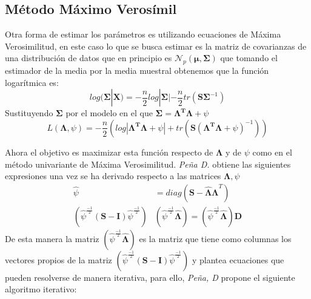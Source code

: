 \subsection{Método Máximo Verosímil}

\noindent Otra forma de estimar los parámetros es utilizando ecuaciones de Máxima Verosimilitud, en este caso lo que se busca estimar es la matriz de covarianzas de una distribución de datos que en principio es $\mathcal{N}_p(\mathbf{\mu},\mathbf{\Sigma})$ que tomando el estimador de la media por la media muestral obtenemos que la función logarítmica es: 
\begin{equation}
log(\mathbf{\Sigma}|\textbf{X})=-\dfrac{n}{2}log|\mathbf{\Sigma}|-\dfrac{n}{2}tr(\mathbf{S\Sigma}^{-1})
\end{equation}
\noindent Sustituyendo $\mathbf{\Sigma}$ por el modelo en el que $\mathbf{\Sigma}=\mathbf{\mathbf{\Lambda}^T\mathbf{\Lambda}}+\psi$
\begin{equation}
L(\mathbf{\Lambda},\psi)=-\dfrac{n}{2}(log|\mathbf{\mathbf{\Lambda}^T\mathbf{\Lambda}}+\psi| +tr(\textbf{S}(\mathbf{\mathbf{\Lambda}^T\mathbf{\Lambda}}+\psi)^{-1}))
\end{equation}

\noindent Ahora el objetivo es maximizar esta función respecto de $\mathbf{\Lambda}$  y de $\psi$ como en el método univariante de Máxima Verosimilitud. \emph{Peña D.}\cite{Peña 2002} obtiene las siguientes expresiones una vez se ha derivado respecto a las matrices $\mathbf{\Lambda}, \psi$
\begin{align}
\hat{\psi}&=diag(\textbf{S}-\mathbf{\hat{\Lambda}}\mathbf{\hat{\Lambda}}^T)\\
(\hat{\psi}^{\frac{-1}{2}}(\textbf{S}-\textbf{I})\hat{\psi}^{\frac{-1}{2}})&(\hat{\psi}^{\frac{-1}{2}}\mathbf{\hat{\Lambda}})=(\hat{\psi}^{\frac{-1}{2}}\mathbf{\hat{\Lambda}})\textbf{D}
\end{align}
\noindent De esta manera la matriz $(\hat{\psi}^{\frac{-1}{2}}\mathbf{\hat{\Lambda}})$ es la matriz que tiene como columnas los vectores propios de la matriz $(\hat{\psi}^{\frac{-1}{2}}(\textbf{S}-\textbf{I})\hat{\psi}^{\frac{-1}{2}})$ y plantea ecuaciones que pueden resolverse de manera iterativa, para ello, \emph{Peña, D}\cite{Peña 2002} propone el siguiente algoritmo iterativo:

